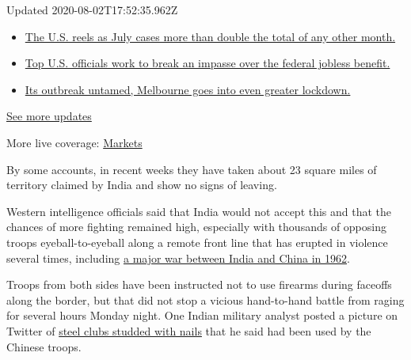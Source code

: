 Updated 2020-08-02T17:52:35.962Z

\begin{itemize}
\tightlist
\item
  \href{https://www.nytimes.com/2020/08/01/world/coronavirus-covid-19.html?action=click\&pgtype=Article\&state=default\&region=MAIN_CONTENT_1\&context=storylines_live_updates\#link-34047410}{The
  U.S. reels as July cases more than double the total of any other
  month.}
\item
  \href{https://www.nytimes.com/2020/08/01/world/coronavirus-covid-19.html?action=click\&pgtype=Article\&state=default\&region=MAIN_CONTENT_1\&context=storylines_live_updates\#link-780ec966}{Top
  U.S. officials work to break an impasse over the federal jobless
  benefit.}
\item
  \href{https://www.nytimes.com/2020/08/01/world/coronavirus-covid-19.html?action=click\&pgtype=Article\&state=default\&region=MAIN_CONTENT_1\&context=storylines_live_updates\#link-2bc8948}{Its
  outbreak untamed, Melbourne goes into even greater lockdown.}
\end{itemize}

\href{https://www.nytimes.com/2020/08/01/world/coronavirus-covid-19.html?action=click\&pgtype=Article\&state=default\&region=MAIN_CONTENT_1\&context=storylines_live_updates}{See
more updates}

More live coverage:
\href{https://www.nytimes.com/live/2020/07/31/business/stock-market-today-coronavirus?action=click\&pgtype=Article\&state=default\&region=MAIN_CONTENT_1\&context=storylines_live_updates}{Markets}

By some accounts, in recent weeks they have taken about 23 square miles
of territory claimed by India and show no signs of leaving.

Western intelligence officials said that India would not accept this and
that the chances of more fighting remained high, especially with
thousands of opposing troops eyeball-to-eyeball along a remote front
line that has erupted in violence several times, including
\href{https://www.nytimes.com/2020/06/17/world/asia/india-china-border-clashes.html}{a
major war between India and China in 1962}.

Troops from both sides have been instructed not to use firearms during
faceoffs along the border, but that did not stop a vicious hand-to-hand
battle from raging for several hours Monday night. One Indian military
analyst posted a picture on Twitter of
\href{https://twitter.com/ajaishukla/status/1273478468919951361}{steel
clubs studded with nails} that he said had been used by the Chinese
troops.

